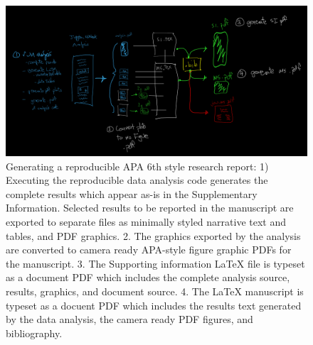 \documentclass[helv,10pt,man,floatsintext]{apa6}  %
\begin{document}
\begin{figure}[ht]
\caption{Generating a reproducible APA 6th style research report: 1)
  Executing the reproducible data analysis code generates the complete
  results which appear as-is in the Supplementary
  Information. Selected results to be reported in the manuscript are
  exported to separate files as minimally styled narrative text and
  tables, and PDF graphics. 2. The graphics exported by the analysis
  are converted to camera ready APA-style figure graphic PDFs for the
  manuscript. 3. The Supporting information \LaTeX{} file is typeset
  as a document PDF which includes the complete analysis source,
  results, graphics, and document source. 4. The \LaTeX{} manuscript
  is typeset as a docuent PDF which includes the results text
  generated by the data analysis, the camera ready PDF figures, and
  bibliography.}  
\includegraphics[width=.95\textwidth]{images/report_generation.png}

\end{figure}
\end{document}
